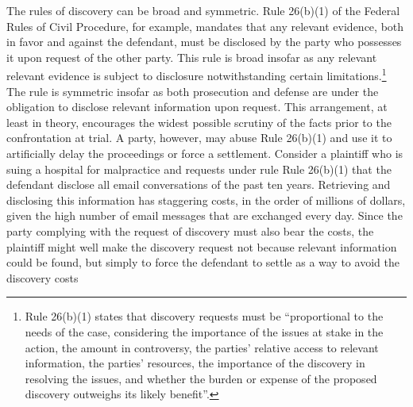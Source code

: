 \documentclass[10pt]{article}
\begin{document}
 The rules of discovery can be broad and symmetric. Rule 26(b)(1) of the Federal Rules of Civil Procedure, for example, mandates that any relevant evidence, both in favor and against the defendant, must be disclosed by the party who possesses it upon request of the other party. 
 This rule is broad insofar as any relevant relevant evidence is subject to disclosure notwithstanding certain limitations.\footnote{Rule 26(b)(1) states that discovery requests must be ``proportional to the needs of the case, considering the importance of the issues at stake in the action, the amount in controversy, the parties' relative access to relevant information, the parties' resources, the importance of the discovery in resolving the issues, and whether the burden or expense of the proposed discovery outweighs its likely benefit''.}
 The rule is symmetric insofar as both prosecution and defense are under the obligation to disclose relevant information upon request. This arrangement, at least in theory, 
 encourages the widest possible scrutiny of the facts prior to the confrontation at trial. %
 A party, however, may abuse Rule 26(b)(1) and use it to artificially delay the proceedings or force a settlement. 
Consider a plaintiff who is suing a hospital for malpractice and requests under rule Rule 26(b)(1) that the defendant 
disclose all email conversations of the past ten years. Retrieving and disclosing this information has staggering costs, in the order of millions of dollars, given the high number of email messages that are exchanged every day. Since the party complying with the request of discovery must also bear the costs, the plaintiff might well make the discovery request not because relevant information could be found, 
but simply to force the defendant to settle as a way to avoid the discovery costs \citep{Beisner2010}

\end{document}
